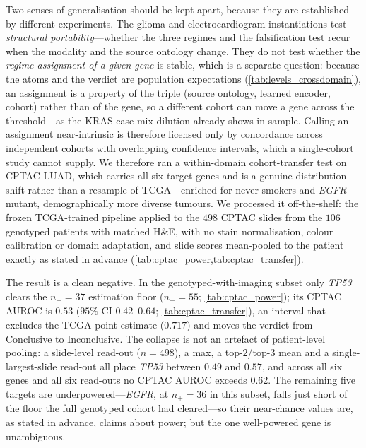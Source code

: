 Two senses of generalisation should be kept apart, because they are
established by different experiments. The glioma and electrocardiogram
instantiations test \emph{structural portability}---whether the three
regimes and the falsification test recur when the modality and the
source ontology change. They do not test whether the \emph{regime
assignment of a given gene} is stable, which is a separate question:
because the atoms and the verdict are population expectations
(\cref{tab:levels_crossdomain}), an assignment is a property of the
triple (source ontology, learned encoder, cohort) rather than of the
gene, so a different cohort can move a gene across the
threshold---as the KRAS case-mix dilution already shows in-sample.
Calling an assignment near-intrinsic is therefore licensed only by
concordance across independent cohorts with overlapping confidence
intervals, which a single-cohort study cannot supply.
We therefore ran a within-domain cohort-transfer test on CPTAC-LUAD, which
carries all six target genes and is a genuine distribution shift rather than
a resample of TCGA---enriched for never-smokers and \textit{EGFR}-mutant,
demographically more diverse
tumours.\cite{gillette2020cptacluad,cptacluad_data}
We processed it off-the-shelf: the frozen TCGA-trained pipeline applied
to the $498$ CPTAC slides from the $106$ genotyped patients with matched
H\&E, with no stain normalisation, colour calibration or domain
adaptation, and slide scores mean-pooled to the patient exactly as
stated in advance (\cref{tab:cptac_power,tab:cptac_transfer}).

The result is a clean negative. In the genotyped-with-imaging subset only
\textit{TP53} clears the $n_+\!=\!37$ estimation floor ($n_+\!=\!55$;
\cref{tab:cptac_power}); its
CPTAC AUROC is $0.53$ ($95\%$ CI $0.42$--$0.64$;
\cref{tab:cptac_transfer}), an interval that
excludes the TCGA point estimate ($0.717$) and moves the verdict from
Conclusive to Inconclusive. The collapse is not an artefact of
patient-level pooling: a slide-level read-out ($n\!=\!498$), a max, a
top-$2$/top-$3$ mean and a single-largest-slide read-out all place
\textit{TP53} between $0.49$ and $0.57$, and across all six genes and
all six read-outs no CPTAC AUROC exceeds $0.62$. The remaining five
targets are underpowered---\textit{EGFR}, at $n_+\!=\!36$ in this subset,
falls just short of the floor the full genotyped cohort had cleared---so their
near-chance values are, as stated in advance, claims about power; but the
one well-powered gene is unambiguous.


